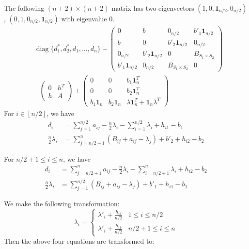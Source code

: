 \documentclass{ctexart}
\DeclareMathOperator{\diag}{diag}
\begin{document}
The following $(n+2)\times (n+2)$ matrix has two eigenvectors
$(1,0,\mathbf{1}_{n/2},0_{n/2})$,
$(0,1,0_{n/2},\mathbf{1}_{n/2})$
with eigenvalue 0.
\begin{align*}
	&\diag\{d_1^*, d_2^*, d_1, \dots, d_n\}
	-\begin{pmatrix}
		0 & b &  0_{n/2} & b'_1 \mathbf{1}_{n/2} \\
		b & 0 & b'_2 \mathbf{1}_{n/2} & 0_{n/2} \\
		0_{n/2} & b'_2 \mathbf{1}_{n/2} & 0 & B_{S_1 \times S_2} \\
		b'_1 \mathbf{1}_{n/2} & 0_{n/2}& B_{S_1 \times S_2} & 0
	\end{pmatrix} \\
	&- \begin{pmatrix}
		0 & h^T \\
		h & A 
	\end{pmatrix}
	+ \begin{pmatrix}
		0 & 0 & b_1  \mathbf{1}^T_{n} \\
		0& 0 & b_2 \mathbf{1}^T_{n} \\
		b_1 \mathbf{1}_{n} & b_2 \mathbf{1}_{n}  & \lambda \mathbf{1}^T_{n} + \mathbf{1}_{n} \lambda^T
	\end{pmatrix}
\end{align*}
For $i\in [n/2]$, we have
\begin{align*}
	d_i &= \sum_{j=1}^{n/2} a_{ij}
	- \frac{n}{2} \lambda_i - \sum_{i=1}^{n/2} \lambda_i + h_{i1} - b_1 \\
	\frac{n}{2} \lambda_i &= \sum_{j=n/2 + 1}^{n} (B_{ij} + a_{ij} - \lambda_j) + b'_2 + h_{i2} - b_2
\end{align*}

For $n/2+1 \leq i \leq n$, we have
\begin{align*}
	d_i &= \sum_{j=n/2+1}^{n} a_{ij}
	- \frac{n}{2} \lambda_i - \sum_{i=n/2+1}^{n} \lambda_i + h_{i2} - b_2 \\
	\frac{n}{2} \lambda_i &= \sum_{j=1}^{n/2} (B_{ij} + a_{ij} - \lambda_j) + b'_1 + h_{i1} - b_1
\end{align*}

We make the following transformation:
\begin{equation*}
	\lambda_i = \begin{cases}
		\lambda'_i + \frac{h_{i2}}{n/2} & 1\leq i \leq n/2 \\
		\lambda'_i + \frac{h_{i1}}{n/2} & n/2+1 \leq i \leq n 
	\end{cases}
\end{equation*}
Then the above four equations are transformed to:
\end{document}
